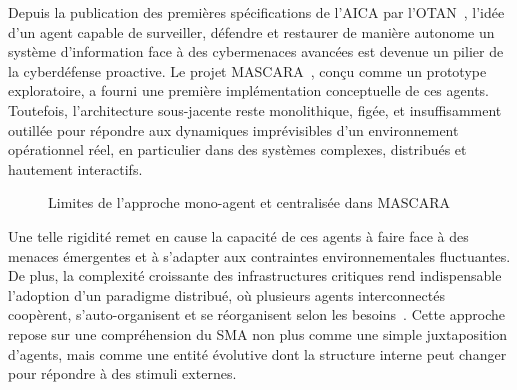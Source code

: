 \documentclass[ twoside,openright,titlepage,numbers=noenddot,headinclude,%
                footinclude=true,cleardoublepage=empty,abstractoff, %
                BCOR=5mm,paper=a4,fontsize=11pt,%
                french,american,%
                ]{scrreprt}
\begin{document}

Depuis la publication des premières spécifications de l'AICA par l'OTAN~\cite{AICAGuide2022}, l'idée d'un agent capable de surveiller, défendre et restaurer de manière autonome un système d'information face à des cybermenaces avancées est devenue un pilier de la cyberdéfense proactive. Le projet MASCARA~\cite{MASCARA2022}, conçu comme un prototype exploratoire, a fourni une première implémentation conceptuelle de ces agents. Toutefois, l'architecture sous-jacente reste monolithique, figée, et insuffisamment outillée pour répondre aux dynamiques imprévisibles d'un environnement opérationnel réel, en particulier dans des systèmes complexes, distribués et hautement interactifs.

\begin{figure}[h]
    \centering
    \caption{Limites de l'approche mono-agent et centralisée dans MASCARA}
    \label{fig:mascara-limit}
\end{figure}

Une telle rigidité remet en cause la capacité de ces agents à faire face à des menaces émergentes et à s'adapter aux contraintes environnementales fluctuantes. De plus, la complexité croissante des infrastructures critiques rend indispensable l'adoption d'un paradigme distribué, où plusieurs agents interconnectés coopèrent, s'auto-organisent et se réorganisent selon les besoins~\cite{Ferber1999, Gleizes2008}. Cette approche repose sur une compréhension du SMA non plus comme une simple juxtaposition d'agents, mais comme une entité évolutive dont la structure interne peut changer pour répondre à des stimuli externes.
\end{document}
